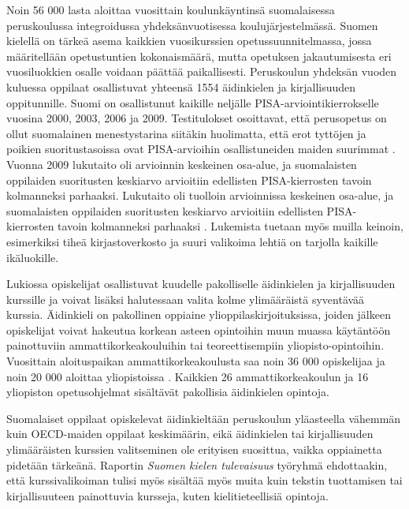 \documentclass[]{../../metanetpaper}
\begin{document}
\begin{multicols}{2}
 
Noin 56 000 lasta aloittaa vuosittain koulunkäyntinsä suomalaisessa
peruskoulussa integroidussa yhdeksänvuotisessa koulujärjestelmässä. Suomen
kielellä on tärkeä asema kaikkien vuosikurssien opetussuunnitelmassa, jossa
määritellään opetustuntien kokonaismäärä, mutta opetuksen jakautumisesta eri
vuosiluokkien osalle voidaan päättää paikallisesti. Peruskoulun yhdeksän vuoden
kuluessa oppilaat osallistuvat yhteensä 1554 äidinkielen ja kirjallisuuden oppitunnille.
Suomi on osallistunut kaikille neljälle PISA-arviointikierrokselle
vuosina 2000, 2003, 2006 ja 2009. Testitulokset osoittavat, että
perusopetus on ollut suomalainen menestystarina siitäkin huolimatta,
että erot tyttöjen ja poikien suoritustasoissa ovat PISA-arvioihin
osallistuneiden maiden suurimmat \cite{Literacy}. Vuonna 2009 lukutaito 
oli arvioinnin keskeinen osa-alue, ja suomalaisten oppilaiden
suoritusten keskiarvo arvioitiin edellisten PISA-kierrosten tavoin
kolmanneksi parhaaksi. Lukutaito oli tuolloin arvioinnissa keskeinen osa-alue, 
ja suomalaisten oppilaiden suoritusten keskiarvo
arvioitiin edellisten PISA-kierrosten tavoin kolmanneksi parhaaksi
\cite{Pisa2006}. Lukemista tuetaan myös muilla keinoin,
esimerkiksi tiheä kirjastoverkosto ja suuri valikoima lehtiä on
tarjolla kaikille ikäluokille.

Lukiossa opiskelijat osallistuvat kuudelle pakolliselle
äidinkielen ja kirjallisuuden kurssille ja voivat lisäksi
halutessaan valita kolme ylimääräistä syventävää kurssia. Äidinkieli
on pakollinen oppiaine ylioppilaskirjoituksissa, joiden jälkeen
opiskelijat voivat hakeutua korkean asteen opintoihin muun muassa
käytäntöön painottuviin ammattikorkeakouluihin tai teoreettisempiin
yliopisto-opintoihin. Vuosittain aloituspaikan ammattikorkeakoulusta
saa noin 36 000 opiskelijaa ja noin 20 000 aloittaa yliopistoissa
\cite{Education}. Kaikkien 26 ammattikorkeakoulun ja 16 yliopiston
opetusohjelmat sisältävät pakollisia äidinkielen opintoja.

Suomalaiset oppilaat opiskelevat äidinkieltään peruskoulun yläasteella
vähemmän kuin OECD-maiden oppilaat keskimäärin, eikä äidinkielen tai
kirjallisuuden ylimääräisten kurssien valitseminen ole 
erityisen suosittua, vaikka oppiainetta pidetään tärkeänä. Raportin
\textit{Suomen kielen tulevaisuus} \cite{Tulevaisuus2009} työryhmä
ehdottaakin, että kurssivalikoiman tulisi myös sisältää myös muita
kuin tekstin tuottamisen tai kirjallisuuteen painottuvia kursseja,
kuten kielitieteellisiä opintoja.


\end{multicols}
\end{document}
